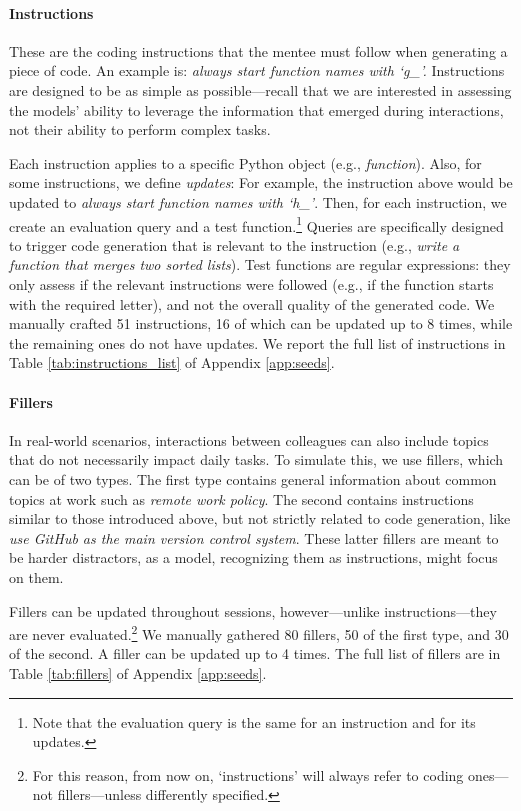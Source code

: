 \paragraph{Instructions}
These are the coding instructions that the mentee must follow when generating a piece of code. 
An example is: \textit{always start function names with `g\_'.} Instructions are designed to be as simple as possible---recall that
we are interested in assessing the models' ability to leverage the information that emerged during interactions, not 
their ability to perform complex tasks. 

Each instruction applies to a specific Python object (e.g., \textit{function}).
Also, for some instructions, we define \textit{updates}:
For example, the instruction above would be updated to \textit{always start function names with `h\_'}.
Then, for each instruction,
we create an evaluation query and a test function.\footnote{Note that the evaluation query is the same for an instruction and for its updates.} Queries are specifically designed to trigger code generation that is relevant to the instruction (e.g., \textit{write a function that merges two sorted lists}).
Test functions are regular expressions: they only assess if the relevant instructions were followed (e.g., if the function starts with the required letter), and not the overall quality of the generated code.
We manually crafted 51 instructions, 16 of which can be updated up to 8 times, while the remaining ones do not have updates. We report the full list of instructions in Table \ref{tab:instructions_list} of Appendix \ref{app:seeds}.


\paragraph{Fillers} In real-world scenarios, interactions between colleagues can also include topics that do not necessarily impact daily tasks. To simulate this, we use fillers, which can be of two types. 
The first type contains general information about common topics at work such as \textit{remote work policy}.
The second contains instructions similar to those introduced above, but not strictly related to code generation, like \textit{use GitHub as the main version control system}. These latter fillers are meant to be harder distractors, as a model, recognizing them as instructions, might focus on them.

Fillers can be updated throughout sessions, however---unlike instructions---they are never evaluated.\footnote{For this reason, 
from now on,
`instructions' will always refer to 
coding ones---not fillers---unless
differently specified.}
We manually gathered 80 fillers, 50 of the first type, and 30 of the second. A filler can be updated up to 4 times. The full list of fillers are in Table \ref{tab:fillers} of Appendix \ref{app:seeds}.

